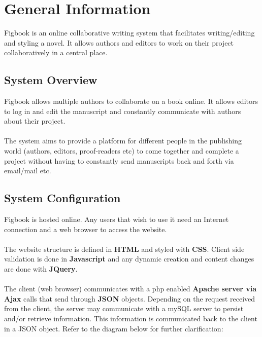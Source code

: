 \section{General Information}
\par{Figbook is an online collaborative writing system that facilitates writing/editing and styling a novel. It allows authors and editors to work on their project collaboratively in a central place.}

\subsection{System Overview}
\par{Figbook allows multiple authors to collaborate on a book online. It allows editors to log in and edit the manuscript and constantly communicate with authors about their project. \\ \\The system aims to provide a platform for different people in the publishing world (authors, editors, proof-readers etc) to come together and complete a project without having to constantly send manuscripts back and forth via email/mail etc.}

\subsection{System Configuration}
\par{Figbook is hosted online. Any users that wish to use it need an Internet connection and a web browser to access the website.\\ \\The website structure is defined in \textbf{HTML} and styled with \textbf{CSS}. Client side validation is done in \textbf{Javascript} and any dynamic creation and content changes are done with \textbf{JQuery}.\\ \\The client (web browser) communicates with a php enabled \textbf{Apache server via Ajax} calls that send through \textbf{JSON} objects. Depending on the request received from the client, the server may communicate with a mySQL server to persist and/or retrieve information. This information is communicated back to the client in a JSON object. Refer to the diagram below for further clarification:}

